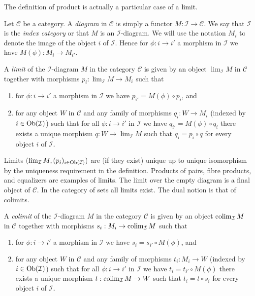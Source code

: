 The definition of product is actually a particular case of a limit.

\medskip\noindent
Let $\mathcal{C}$ be a category. A {\it diagram} in $\mathcal{C}$ is
simply a functor $M : \mathcal{I} \to \mathcal{C}$. We say that
$\mathcal{I}$ is the {\it index category} or that $M$ is an
$\mathcal{I}$-diagram. We will use the notation $M_i$ to denote the
image of the object
$i$ of $\mathcal{I}$. Hence for $\phi : i \to i'$ a morphism
in $\mathcal{I}$ we have $M(\phi) : M_i \to M_{i'}$.

\begin{definition}
\label{definition-limit}
A {\it limit} of the $\mathcal{I}$-diagram $M$ in the category
$\mathcal{C}$ is given by an object $\lim_\mathcal{I} M$ in $\mathcal{C}$
together with morphisms $p_i : \lim_\mathcal{I} M \to M_i$ such that
\begin{enumerate}
\item for $\phi : i \to i'$ a morphism
in $\mathcal{I}$ we have $p_{i'} = M(\phi) \circ p_i$, and
\item for any object $W$ in $\mathcal{C}$ and any family of
morphisms $q_i : W \to M_i$ (indexed by $i \in \mathop{\mathrm{Ob}}\nolimits(\mathcal{I})$)
such that for all $\phi : i \to i'$
in $\mathcal{I}$ we have $q_{i'} = M(\phi) \circ q_i$ there
exists a unique morphism $q : W \to \lim_\mathcal{I} M$ such that
$q_i = p_i \circ q$ for every object $i$ of $\mathcal{I}$.
\end{enumerate}
\end{definition}

\noindent
Limits $(\mathop{\mathrm{lim}}\nolimits_\mathcal{I} M, (p_i)_{i\in \mathop{\mathrm{Ob}}\nolimits(\mathcal{I})})$ are
(if they exist)
unique up to unique isomorphism by the uniqueness requirement
in the definition. Products of pairs, fibre products, and equalizers are
examples of limits. The limit over the empty diagram is a final object
of $\mathcal{C}$.
In the category of sets all limits exist.
The dual notion is that of colimits.

\begin{definition}
\label{definition-colimit}
A {\it colimit} of the $\mathcal{I}$-diagram $M$ in the category
$\mathcal{C}$ is given by an object $\mathop{\mathrm{colim}}\nolimits_\mathcal{I} M$ in $\mathcal{C}$
together with morphisms $s_i : M_i \to \mathop{\mathrm{colim}}\nolimits_\mathcal{I} M$ such that
\begin{enumerate}
\item for $\phi : i \to i'$ a morphism
in $\mathcal{I}$ we have $s_i = s_{i'} \circ M(\phi)$, and
\item for any object $W$ in $\mathcal{C}$ and any family of
morphisms $t_i : M_i \to W$ (indexed by $i \in \mathop{\mathrm{Ob}}\nolimits(\mathcal{I})$)
such that for all $\phi : i \to i'$
in $\mathcal{I}$ we have $t_i = t_{i'} \circ M(\phi)$ there
exists a unique morphism $t : \mathop{\mathrm{colim}}\nolimits_\mathcal{I} M \to W$ such that
$t_i = t \circ s_i$ for every object $i$ of $\mathcal{I}$.
\end{enumerate}
\end{definition}

